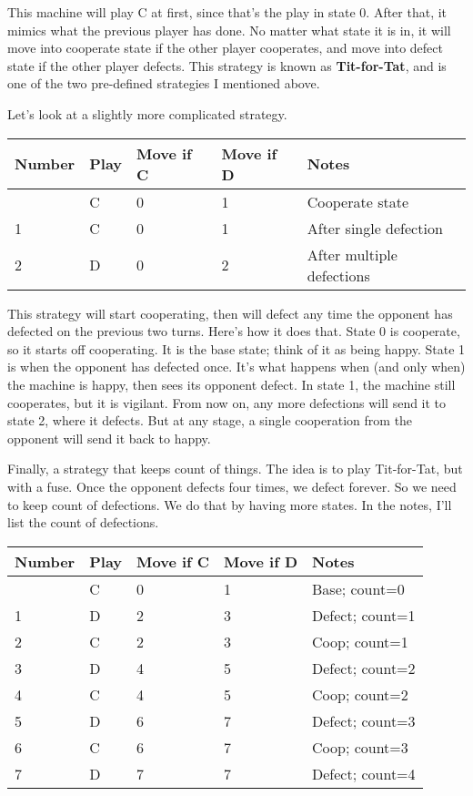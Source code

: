 \documentclass[
  11pt,
]{article}
\begin{document}
This machine will play C at first, since that's the play in state 0.
After that, it mimics what the previous player has done. No matter what
state it is in, it will move into cooperate state if the other player
cooperates, and move into defect state if the other player defects. This
strategy is known as \textbf{Tit-for-Tat}, and is one of the two
pre-defined strategies I mentioned above.

Let's look at a slightly more complicated strategy.

\begin{longtable}[]{@{}lllll@{}}
\toprule\noalign{}
Number & Play & Move if C & Move if D & Notes \\
\midrule\noalign{}
\endhead
\bottomrule\noalign{}
\endlastfoot
0 & C & 0 & 1 & Cooperate state \\
1 & C & 0 & 1 & After single defection \\
2 & D & 0 & 2 & After multiple defections \\
\end{longtable}

This strategy will start cooperating, then will defect any time the
opponent has defected on the previous two turns. Here's how it does
that. State 0 is cooperate, so it starts off cooperating. It is the base
state; think of it as being happy. State 1 is when the opponent has
defected once. It's what happens when (and only when) the machine is
happy, then sees its opponent defect. In state 1, the machine still
cooperates, but it is vigilant. From now on, any more defections will
send it to state 2, where it defects. But at any stage, a single
cooperation from the opponent will send it back to happy.

Finally, a strategy that keeps count of things. The idea is to play
Tit-for-Tat, but with a fuse. Once the opponent defects four times, we
defect forever. So we need to keep count of defections. We do that by
having more states. In the notes, I'll list the count of defections.

\newpage

\begin{longtable}[]{@{}lllll@{}}
\toprule\noalign{}
Number & Play & Move if C & Move if D & Notes \\
\midrule\noalign{}
\endhead
\bottomrule\noalign{}
\endlastfoot
0 & C & 0 & 1 & Base; count=0 \\
1 & D & 2 & 3 & Defect; count=1 \\
2 & C & 2 & 3 & Coop; count=1 \\
3 & D & 4 & 5 & Defect; count=2 \\
4 & C & 4 & 5 & Coop; count=2 \\
5 & D & 6 & 7 & Defect; count=3 \\
6 & C & 6 & 7 & Coop; count=3 \\
7 & D & 7 & 7 & Defect; count=4 \\
\end{longtable}
\end{document}
